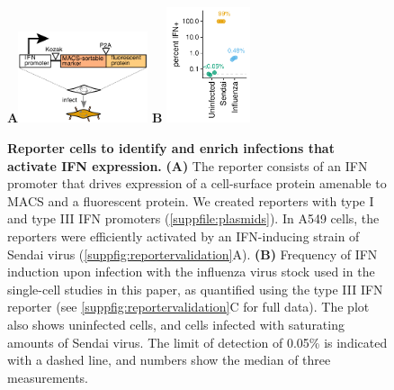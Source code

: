 \documentclass[10pt,letterpaper]{article}
\newcommand{\SUPPFILE}[1]{\autoref{suppfile:#1}}
\newcommand{\SUPPFIG}[1]{\autoref{suppfig:#1}}
\begin{document}
\begin{figure}
\centerline{
{\bf \Large A}\includegraphics[width=0.34\textwidth,valign=t]{figures/IFN_stochastic/IFN_reporter/IFN_reporter.pdf}
\hspace{0.02\textwidth}
{\bf \Large B} \includegraphics[width=0.22\textwidth,valign=t]{figures/IFN_stochastic/Flow/ifn_percent.pdf}
}
\caption{
{\bf Reporter cells to identify and enrich infections that activate IFN expression.}
{\bf (A)} The reporter consists of an IFN promoter that drives expression of a cell-surface protein amenable to MACS and a fluorescent protein.
We created reporters with type I and type III IFN promoters (\SUPPFILE{plasmids}).
In A549 cells, the reporters were efficiently activated by an IFN-inducing strain of Sendai virus (\SUPPFIG{reportervalidation}A).
{\bf (B)}
Frequency of IFN induction upon infection with the influenza virus stock used in the single-cell studies in this paper, as quantified using the type III IFN reporter (see \SUPPFIG{reportervalidation}C for full data).
The plot also shows uninfected cells, and cells infected with saturating amounts of Sendai virus.
The limit of detection of 0.05\% is indicated with a dashed line, and numbers show the median of three measurements.
}
\label{fig:IFNrare}
\end{figure}
\end{document}
